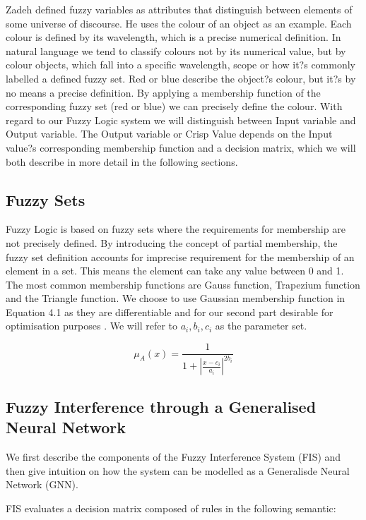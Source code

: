 Zadeh defined fuzzy variables as attributes that distinguish between elements of some universe of discourse. He uses the colour of an object as an example. Each colour is defined by its wavelength, which is a precise numerical definition. In natural language we tend to classify colours not by its numerical value, but by colour objects, which fall into a specific wavelength, scope or how it?s commonly labelled a defined fuzzy set. Red or blue describe the object?s colour, but it?s by no means a precise definition. By applying a membership function of the corresponding fuzzy set (red or blue) we can precisely define the colour. With regard to our Fuzzy Logic system we will distinguish between Input variable and Output variable. The Output variable or Crisp Value depends on the Input value?s corresponding membership function and a decision matrix, which we will both describe in more detail in the following sections.


\subsection{Fuzzy Sets}

Fuzzy Logic is based on fuzzy sets where the requirements for membership are not precisely defined. By introducing the concept of partial membership, the fuzzy set definition accounts for imprecise requirement for the membership of an element in a set. This means the element can take any value between 0 and 1. The most common membership functions are Gauss function, Trapezium function and the Triangle function. We choose to use Gaussian membership function in Equation 4.1 as they are differentiable and for our second part desirable for optimisation purposes \cite{wu12}. We will refer to $a_i, b_i, c_i$ as the parameter set. 


\begin{equation} \label{eq:gaus}
\mu_A(x) =  \frac{1}{ 1 + |\frac{x- c_i }{a_i}|^{2b_i}  }\end{equation}


\subsection{Fuzzy Interference through a Generalised Neural Network}

We first describe the components of the Fuzzy Interference System (FIS) and then give intuition on how the system can be modelled as a Generalisde Neural Network (GNN). 

FIS evaluates a decision matrix composed of rules in the following semantic: 


